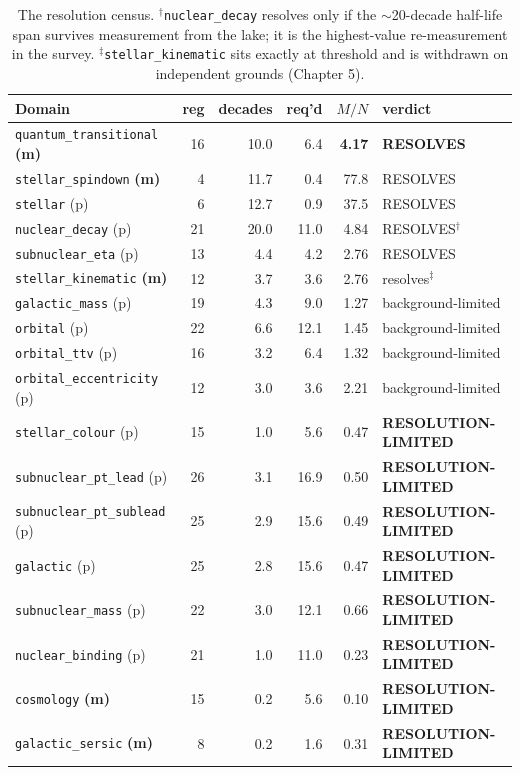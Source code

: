 \documentclass[11pt, letterpaper, openany]{book}
\newcommand{\MN}{M/N}
\begin{document}
\begin{table}[H]
\centering
\footnotesize
\begin{tabular}{@{}lrrrrl@{}}
\toprule
\textbf{Domain} & \textbf{reg} & \textbf{decades} & \textbf{req'd} & \textbf{$\MN$} & \textbf{verdict} \\
\midrule
\texttt{quantum\_transitional} \textbf{(m)} & 16 & 10.0 & 6.4 & \textbf{4.17} & \textbf{RESOLVES} \\
\texttt{stellar\_spindown} \textbf{(m)} & 4 & 11.7 & 0.4 & 77.8 & RESOLVES \\
\texttt{stellar} (p) & 6 & 12.7 & 0.9 & 37.5 & RESOLVES \\
\texttt{nuclear\_decay} (p) & 21 & 20.0 & 11.0 & 4.84 & RESOLVES$^\dagger$ \\
\texttt{subnuclear\_eta} (p) & 13 & 4.4 & 4.2 & 2.76 & RESOLVES \\
\texttt{stellar\_kinematic} \textbf{(m)} & 12 & 3.7 & 3.6 & 2.76 & resolves$^\ddagger$ \\
\midrule
\texttt{galactic\_mass} (p) & 19 & 4.3 & 9.0 & 1.27 & background-limited \\
\texttt{orbital} (p) & 22 & 6.6 & 12.1 & 1.45 & background-limited \\
\texttt{orbital\_ttv} (p) & 16 & 3.2 & 6.4 & 1.32 & background-limited \\
\texttt{orbital\_eccentricity} (p) & 12 & 3.0 & 3.6 & 2.21 & background-limited \\
\midrule
\texttt{stellar\_colour} (p) & 15 & 1.0 & 5.6 & 0.47 & \textbf{RESOLUTION-LIMITED} \\
\texttt{subnuclear\_pt\_lead} (p) & 26 & 3.1 & 16.9 & 0.50 & \textbf{RESOLUTION-LIMITED} \\
\texttt{subnuclear\_pt\_sublead} (p) & 25 & 2.9 & 15.6 & 0.49 & \textbf{RESOLUTION-LIMITED} \\
\texttt{galactic} (p) & 25 & 2.8 & 15.6 & 0.47 & \textbf{RESOLUTION-LIMITED} \\
\texttt{subnuclear\_mass} (p) & 22 & 3.0 & 12.1 & 0.66 & \textbf{RESOLUTION-LIMITED} \\
\texttt{nuclear\_binding} (p) & 21 & 1.0 & 11.0 & 0.23 & \textbf{RESOLUTION-LIMITED} \\
\texttt{cosmology} \textbf{(m)} & 15 & 0.2 & 5.6 & 0.10 & \textbf{RESOLUTION-LIMITED} \\
\texttt{galactic\_sersic} \textbf{(m)} & 8 & 0.2 & 1.6 & 0.31 & \textbf{RESOLUTION-LIMITED} \\
\bottomrule
\end{tabular}
\caption{The resolution census. $^\dagger$\texttt{nuclear\_decay} resolves only if the
$\sim$20-decade half-life span survives measurement from the lake; it is the highest-value
re-measurement in the survey. $^\ddagger$\texttt{stellar\_kinematic} sits exactly at threshold
and is withdrawn on independent grounds (Chapter 5).}
\end{table}
\end{document}
